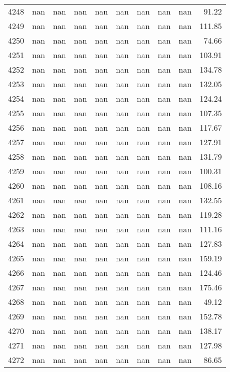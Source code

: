 \begin{tabular}{lrrrrrrrrr}
4248 & nan & nan & nan & nan & nan & nan & nan & nan & 91.22 \\
4249 & nan & nan & nan & nan & nan & nan & nan & nan & 111.85 \\
4250 & nan & nan & nan & nan & nan & nan & nan & nan & 74.66 \\
4251 & nan & nan & nan & nan & nan & nan & nan & nan & 103.91 \\
4252 & nan & nan & nan & nan & nan & nan & nan & nan & 134.78 \\
4253 & nan & nan & nan & nan & nan & nan & nan & nan & 132.05 \\
4254 & nan & nan & nan & nan & nan & nan & nan & nan & 124.24 \\
4255 & nan & nan & nan & nan & nan & nan & nan & nan & 107.35 \\
4256 & nan & nan & nan & nan & nan & nan & nan & nan & 117.67 \\
4257 & nan & nan & nan & nan & nan & nan & nan & nan & 127.91 \\
4258 & nan & nan & nan & nan & nan & nan & nan & nan & 131.79 \\
4259 & nan & nan & nan & nan & nan & nan & nan & nan & 100.31 \\
4260 & nan & nan & nan & nan & nan & nan & nan & nan & 108.16 \\
4261 & nan & nan & nan & nan & nan & nan & nan & nan & 132.55 \\
4262 & nan & nan & nan & nan & nan & nan & nan & nan & 119.28 \\
4263 & nan & nan & nan & nan & nan & nan & nan & nan & 111.16 \\
4264 & nan & nan & nan & nan & nan & nan & nan & nan & 127.83 \\
4265 & nan & nan & nan & nan & nan & nan & nan & nan & 159.19 \\
4266 & nan & nan & nan & nan & nan & nan & nan & nan & 124.46 \\
4267 & nan & nan & nan & nan & nan & nan & nan & nan & 175.46 \\
4268 & nan & nan & nan & nan & nan & nan & nan & nan & 49.12 \\
4269 & nan & nan & nan & nan & nan & nan & nan & nan & 152.78 \\
4270 & nan & nan & nan & nan & nan & nan & nan & nan & 138.17 \\
4271 & nan & nan & nan & nan & nan & nan & nan & nan & 127.98 \\
4272 & nan & nan & nan & nan & nan & nan & nan & nan & 86.65 \\

\end{tabular}
